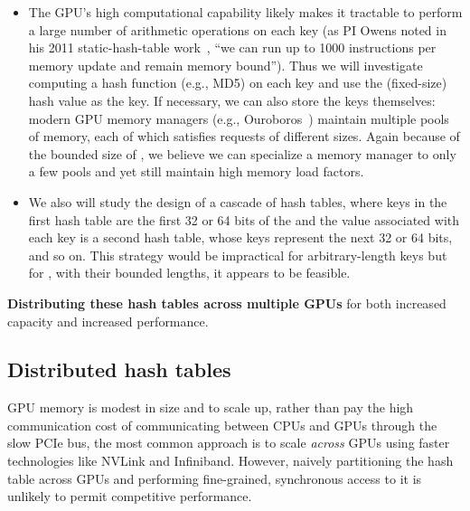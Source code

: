 \begin{itemize}%
  \item The GPU's high computational capability likely makes it tractable to perform a large number of arithmetic operations on each key (as PI Owens noted in his 2011 static-hash-table work~\cite{Alcantara:2011:BAE}, ``we can run up to 1000 instructions per memory update and remain memory bound''). Thus we will investigate computing a hash function (e.g., MD5) on each key and use the (fixed-size) hash value as the key. If necessary, we can also store the keys themselves: modern GPU memory managers (e.g., Ouroboros~\cite{Winter:2020:OVQ}) maintain multiple pools of memory, each of which satisfies requests of different sizes. Again because of the bounded size of \kmers, we believe we can specialize a memory manager to only a few pools and yet still maintain high memory load factors.
  \item We also will study the design of a cascade of hash tables, where keys in the first hash table are the first 32 or 64 bits of the \kmer and the value associated with each key is a second hash table, whose keys represent the next 32 or 64 bits, and so on. This strategy would be impractical for arbitrary-length keys but for \kmers, with their bounded lengths, it appears to be feasible.
\end{itemize}



\begin{rproblem}
  \textbf{Distributing these hash tables across multiple GPUs} for both increased capacity and increased performance.
  \label{rprob:dist-hashtable}
\end{rproblem}

\subsection{Distributed hash tables}

GPU memory is modest in size and to scale up, rather than pay the high communication cost of communicating between CPUs and GPUs through the slow PCIe bus, the most common approach is to scale \emph{across} GPUs using faster technologies like NVLink and Infiniband. However, naively partitioning the hash table across GPUs and performing fine-grained, synchronous access to it is unlikely to permit competitive performance.

